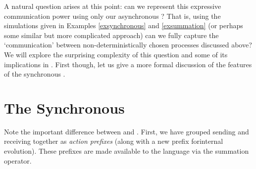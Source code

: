 A natural question arises at this point: can we represent this expressive communication power using only our asynchronous \picalc?  That is, using the simulations given in Examples \ref{exsynchronous} and \ref{exsummation} (or perhaps some similar but more complicated approach) can we fully capture the `communication' between non-deterministically chosen processes discussed above?  We will explore the surprising complexity of this question and some of its implications in .  First though, let us give a more formal discussion of the features of the synchronous \picalc. 

\section{The Synchronous \Picalc}\label{Synchronous picalc}


Note the important difference between  and .  First, we have grouped sending and receiving together as \emph{action prefixes} (along with a new prefix forinternal evolution). These prefixes are made available to the language via the summation operator. 

